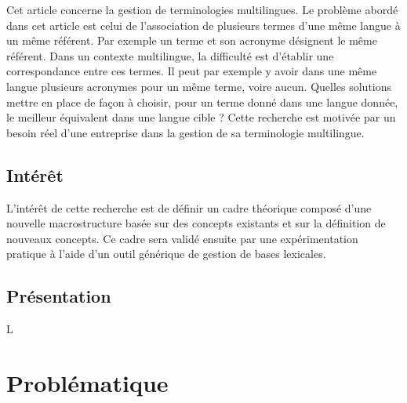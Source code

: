 \documentclass[10pt,a4paper,twoside]{article}
\begin{document}
Cet article concerne la gestion de terminologies multilingues. Le problème abordé dans cet article est celui de l'association de plusieurs termes d'une même langue à un même référent. Par exemple un terme et son acronyme désignent le même référent. Dans un contexte multilingue, la difficulté est d'établir une correspondance entre ces termes. Il peut par exemple y avoir dans une même langue plusieurs acronymes pour un même terme, voire aucun. Quelles solutions mettre en place de façon à choisir, pour un terme donné dans une langue donnée, le meilleur équivalent dans une langue cible ?
Cette recherche est motivée par un besoin réel d'une entreprise dans la gestion de sa terminologie multilingue.

\subsection{Intérêt}

L'intérêt de cette recherche est de définir un cadre théorique composé d'une nouvelle macrostructure basée sur des concepts existants et sur la définition de nouveaux concepts. Ce cadre sera validé ensuite par une expérimentation pratique à l'aide d'un outil générique de gestion de bases lexicales.

\subsection{Présentation}

L

\section{Problématique}
\end{document}
